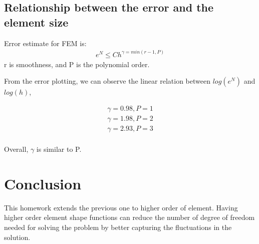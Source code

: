 \documentclass[paper=a4, fontsize=11pt]{article} %
\begin{document}


\subsection{Relationship between the error and the element size}
Error estimate for FEM is:
\begin{eqnarray}
e^N \leq Ch^{\gamma = min (r-1, P)}
\end{eqnarray}
r is smoothness, and P is the polynomial order.

From the error plotting, we can observe the linear relation between $log(e^N)$ and $log(h)$, 

\begin{eqnarray}
\gamma = 0.98, P=1\nonumber\\
\gamma = 1.98, P=2\nonumber\\
\gamma = 2.93, P=3\nonumber\\
\end{eqnarray}

Overall, $\gamma$ is similar  to P. 





\section{Conclusion}

This homework extends the previous one to higher order of element. Having higher order element shape functions can reduce the number of degree of freedom needed for solving the problem by better capturing the fluctuations in the solution. 
\end{document}
